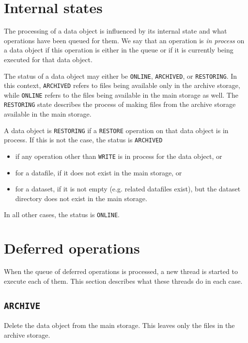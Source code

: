 \documentclass[paper=a4]{scrartcl}
\begin{document}
\section{Internal states}
\label{sec:states}

The processing of a data object is influenced by its internal state
and what operations have been queued for them.  We say that an
operation is \emph{in process} on a data object if this operation is
either in the queue or if it is currently being executed for that
data object.

The status of a data object may either be \texttt{ONLINE},
\texttt{ARCHIVED}, or \texttt{RESTORING}.  In this context,
\texttt{ARCHIVED} refers to files being available only in the archive
storage, while \texttt{ONLINE} refers to the files being available in
the main storage as well.  The \texttt{RESTORING} state describes the
process of making files from the archive storage available in the
main storage.

A data object is \texttt{RESTORING} if a \texttt{RESTORE}
operation on that data object is in process. If this is not the case,
the status is \texttt{ARCHIVED}
\begin{itemize}[noitemsep,topsep=0pt]
\item if any operation other than \texttt{WRITE} is in process
for the data object, or
\item for a datafile, if it does not exist in the main storage, or
\item for a dataset, if it is not empty (e.g. related datafiles
exist), but the dataset directory does not exist in the main storage.
\end{itemize}
In all other cases, the status is \texttt{ONLINE}.


\section{Deferred operations}
\label{sec:defops}

When the queue of deferred operations is processed, a new thread is
started to execute each of them.  This section describes what these
threads do in each case.

\subsection{\texttt{ARCHIVE}}
\label{sec:defops:archive}

Delete the data object from the main storage.  This leaves only the
files in the archive storage.
\end{document}
